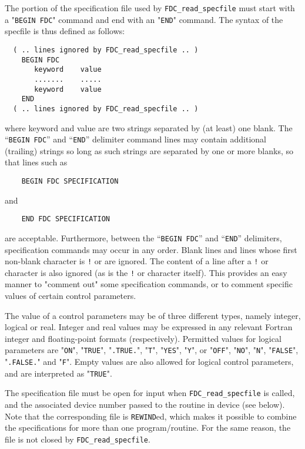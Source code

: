 \documentclass{galahad}
\newcommand{\packagename}{FDC}
\begin{document}
The portion of the specification file used by
{\tt \packagename\_read\_specfile}
must start
with a "{\tt BEGIN \packagename}" command and end with an
"{\tt END}" command.  The syntax of the specfile is thus defined as follows:
\begin{verbatim}
  ( .. lines ignored by FDC_read_specfile .. )
    BEGIN FDC
       keyword    value
       .......    .....
       keyword    value
    END
  ( .. lines ignored by FDC_read_specfile .. )
\end{verbatim}
where keyword and value are two strings separated by (at least) one blank.
The ``{\tt BEGIN \packagename}'' and ``{\tt END}'' delimiter command lines
may contain additional (trailing) strings so long as such strings are
separated by one or more blanks, so that lines such as
\begin{verbatim}
    BEGIN FDC SPECIFICATION
\end{verbatim}
and
\begin{verbatim}
    END FDC SPECIFICATION
\end{verbatim}
are acceptable. Furthermore,
between the
``{\tt BEGIN \packagename}'' and ``{\tt END}'' delimiters,
specification commands may occur in any order.  Blank lines and
lines whose first non-blank character is {\tt !} or {\tt *} are ignored.
The content
of a line after a {\tt !} or {\tt *} character is also
ignored (as is the {\tt !} or {\tt *}
character itself). This provides an easy manner to "comment out" some
specification commands, or to comment specific values
of certain control parameters.

The value of a control parameters may be of three different types, namely
integer, logical or real.
Integer and real values may be expressed in any relevant Fortran integer and
floating-point formats (respectively). Permitted values for logical
parameters are "{\tt ON}", "{\tt TRUE}", "{\tt .TRUE.}", "{\tt T}",
"{\tt YES}", "{\tt Y}", or "{\tt OFF}", "{\tt NO}",
"{\tt N}", "{\tt FALSE}", "{\tt .FALSE.}" and "{\tt F}".
Empty values are also allowed for
logical control parameters, and are interpreted as "{\tt TRUE}".

The specification file must be open for
input when {\tt \packagename\_read\_specfile}
is called, and the associated device number
passed to the routine in device (see below).
Note that the corresponding
file is {\tt REWIND}ed, which makes it possible to combine the specifications
for more than one program/routine.  For the same reason, the file is not
closed by {\tt \packagename\_read\_specfile}.
\end{document}
